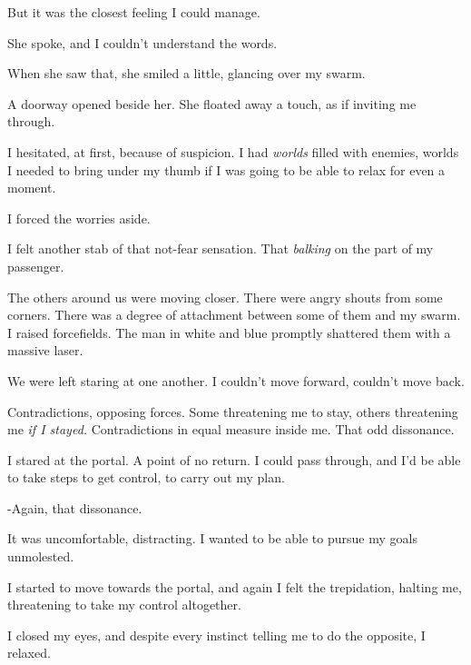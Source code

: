 But it was the closest feeling I could manage.



She spoke, and I couldn't understand the words.



When she saw that, she smiled a little, glancing over my swarm.



A doorway opened beside her.  She floated away a touch, as if inviting me through.



I hesitated, at first, because of suspicion.  I had \emph{worlds} filled with enemies, worlds I needed to bring under my thumb if I was going to be able to relax for even a moment.



I forced the worries aside.



I felt another stab of that not-fear sensation.  That \emph{balking} on the part of my passenger.



The others around us were moving closer.  There were angry shouts from some corners.  There was a degree of attachment between some of them and my swarm.  I raised forcefields.  The man in white and blue promptly shattered them with a massive laser.



We were left staring at one another.  I couldn't move forward, couldn't move back.



Contradictions, opposing forces.  Some threatening me to stay, others threatening me \emph{if I stayed.}  Contradictions in equal measure inside me.  That odd dissonance.



I stared at the portal.  A point of no return.  I could pass through, and I'd be able to take steps to get control, to carry out my plan.



-Again, that dissonance.



It was uncomfortable, distracting.  I wanted to be able to pursue my goals unmolested.



I started to move towards the portal, and again I felt the trepidation, halting me, threatening to take my control altogether.



I closed my eyes, and despite every instinct telling me to do the opposite, I relaxed.



